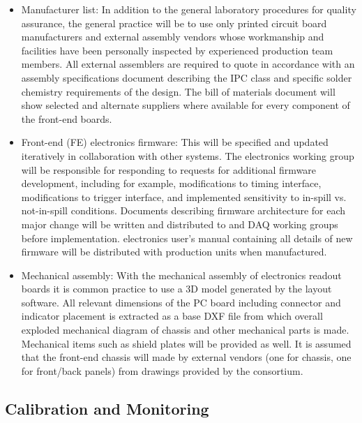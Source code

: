 \begin{itemize}
\item Manufacturer list: In addition to the general laboratory procedures for quality assurance, the general practice will be to use only printed circuit board manufacturers and external assembly vendors whose workmanship and facilities have been personally inspected by experienced production team members. All external assemblers are required to quote in accordance with an assembly specifications document describing the IPC class and specific solder chemistry requirements of the design. The bill of materials document will show selected and alternate suppliers where available for every component of the front-end boards.

\item Front-end (FE) electronics firmware: This will be specified and updated iteratively in collaboration with other systems. The electronics working group will be responsible for responding to requests for additional firmware development, including for example, modifications to timing interface, modifications to trigger interface, and implemented sensitivity to in-spill vs. not-in-spill conditions. Documents describing firmware architecture for each major change will be written and distributed to  and DAQ working groups before implementation.   electronics user's manual containing all details of new firmware will be distributed with production units when manufactured.

\item Mechanical assembly: With the mechanical assembly of electronics readout boards it is common practice to use a 3D model generated by the layout software.  %
All relevant dimensions of the PC board including connector and indicator placement is extracted as a base DXF file from which overall exploded mechanical diagram of chassis and other mechanical parts is made.  Mechanical items such as shield plates will be provided as well. It is assumed that the front-end chassis will made by external vendors (one for chassis, one for front/back panels) from drawings provided by the consortium.

\end{itemize}

\subsection{Calibration and Monitoring}
\label{sec:fdsp-pd-assy-CandM}

